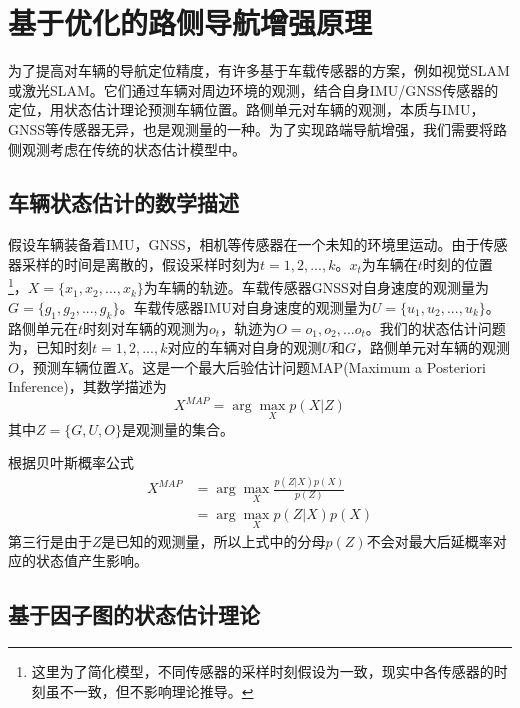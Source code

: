 \newpage
{}
\section{基于优化的路侧导航增强原理}
为了提高对车辆的导航定位精度，有许多基于车载传感器的方案，例如视觉SLAM或激光SLAM。它们通过车辆对周边环境的观测，结合自身IMU/GNSS传感器的定位，用状态估计理论预测车辆位置。路侧单元对车辆的观测，本质与IMU，GNSS等传感器无异，也是观测量的一种。为了实现路端导航增强，我们需要将路侧观测考虑在传统的状态估计模型中。

\subsection{车辆状态估计的数学描述}
\label{sec5.1}
假设车辆装备着IMU，GNSS，相机等传感器在一个未知的环境里运动。由于传感器采样的时间是离散的，假设采样时刻为$t=1,2,...,k$。$x_t$为车辆在$t$时刻的位置\footnote[1]{这里为了简化模型，不同传感器的采样时刻假设为一致，现实中各传感器的时刻虽不一致，但不影响理论推导。}，$X=\{x_1,x_2,...,x_k\}$为车辆的轨迹。车载传感器GNSS对自身速度的观测量为$G=\{g_1,g_2,...,g_k\}$。车载传感器IMU对自身速度的观测量为$U=\{u_1,u_2,...,u_k\}$。路侧单元在$t$时刻对车辆的观测为$o_t$，轨迹为$O={o_1,o_2,...o_t}$。我们的状态估计问题为，已知时刻$t=1,2,...,k$对应的车辆对自身的观测$U$和$G$，路侧单元对车辆的观测$O$，预测车辆位置$X$。这是一个最大后验估计问题MAP(Maximum a Posteriori Inference)，其数学描述为
\begin{equation}
    X^{MAP} = \arg\max\limits_Xp(X|Z)
\end{equation}
其中$Z=\{G,U,O\}$是观测量的集合。

根据贝叶斯概率公式
\begin{equation}
    \begin{aligned}
        X^{MAP}
        &= \arg\max\limits_X\frac{p(Z|X)p(X)}{p(Z)}\\
        &= \arg\max\limits_Xp(Z|X)p(X)
    \end{aligned}
    \label{eq5.2}
\end{equation}
第三行是由于$Z$是已知的观测量，所以上式中的分母$p(Z)$不会对最大后延概率对应的状态值产生影响。

\subsection{基于因子图的状态估计理论}

